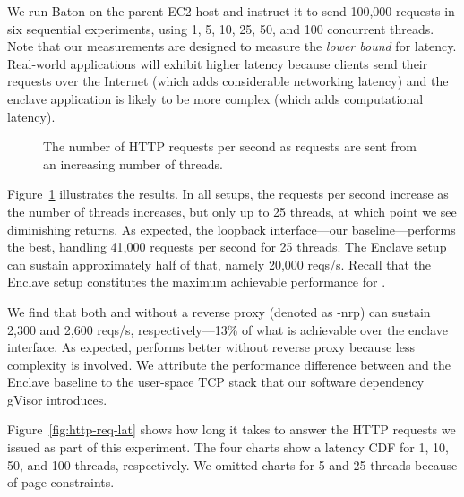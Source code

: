 We run Baton on the parent EC2 host and instruct it to send 100,000 requests in
six sequential experiments, using 1, 5, 10, 25, 50, and 100 concurrent threads.
Note that our measurements are designed to measure the \emph{lower bound} for
latency.  Real-world applications will exhibit higher latency because clients
send their requests over the Internet (which adds considerable networking
latency) and the enclave application is likely to be more complex (which adds
computational latency).

\begin{figure}[t]
  \centering
  
  \caption{The number of HTTP requests per second as requests are sent from an
  increasing number of threads.}%
  \label{fig:http-reqs-sec}
\end{figure}

Figure~\ref{fig:http-reqs-sec} illustrates the results.  In all setups, the
requests per second increase as the number of threads increases, but only up to
25 threads, at which point we see diminishing returns.  As expected, the
loopback interface---our baseline---performs the best, handling 41,000 requests
per second for 25 threads.  The Enclave setup can sustain approximately half of
that, namely 20,000 reqs/s.  Recall that the Enclave setup constitutes the
maximum achievable performance for \tool{}.

We find that both \tool{} and \tool{} without a reverse proxy (denoted as
\Tool{}-nrp) can sustain 2,300 and 2,600 reqs/s, respectively---13\% of what is
achievable over the enclave interface.  As expected, \tool{} performs better
without reverse proxy because less complexity is involved.  We attribute the
performance difference between \tool{} and the Enclave baseline to the
user-space TCP stack that our software dependency gVisor introduces.

Figure~\ref{fig:http-req-lat} shows how long it takes to answer the HTTP
requests we issued as part of this experiment.  The four charts show a latency
CDF for 1, 10, 50, and 100 threads, respectively.  We omitted charts for 5 and
25 threads because of page constraints.

\begin{figure*}[t]
  \centering
  
  \caption{The round-trip time distributions (as CDF) of stress-testing an
  in-enclave Web server as the number of concurrent requesters increases from 1
  to 100 threads.}%
  \label{fig:http-req-lat}
\end{figure*}

